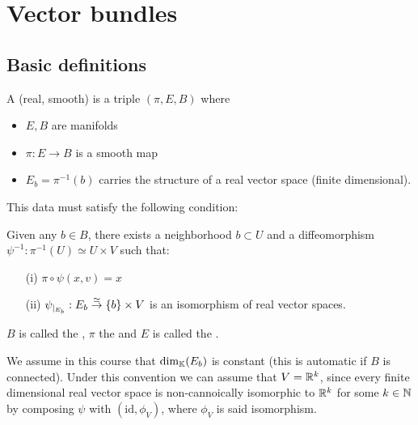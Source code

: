 \section{Vector bundles}

\subsection{Basic definitions}

\begin{definition*}
    A (real, smooth)  is a triple \((\pi,E,B)\) where 
    \begin{itemize}
        \item \(E,B\) are manifolds 
        \item \(\pi:E\to B\) is a smooth map
        \item \(E_b=\pi^{-1}(b)\) carries the structure of a real vector space (finite dimensional).
    \end{itemize}
 
    This data must satisfy the following  condition:

    Given any \(b\in B\), there exists a neighborhood \(b\subset U\) and a diffeomorphism \(\psi^{-1}:\pi^{-1}(U)\simeq U\times V\)
    such that: 
    \begin{enumerate}
        \item[(i)] \(\pi\circ \psi(x,v)=x\)
        \item[(ii)] \(\psi_{|_{E_b}}:E_b\stackrel{\simeq}{\to} \{b\} \times V\) is an isomorphism of real vector spaces.  
    \end{enumerate}
    
    \(B\) is called the , \(\pi\) the  and \(E\) is called the .

\end{definition*}

\begin{remark}
    We assume in this course that \(\text{dim}_{\mathbb{K}}(E_b)\) is constant (this is automatic if \(B\) is connected).
    Under this convention we can assume that \(V=\mathbb{R}^k\), since every finite dimensional real vector space is non-cannoically isomorphic to \(\mathbb{R}^k\) for some \(k\in \mathbb{N}\) by composing \(\psi\) with \((\text{id},\phi_V)\), where \(\phi_V\) is said isomorphism.
\end{remark}

